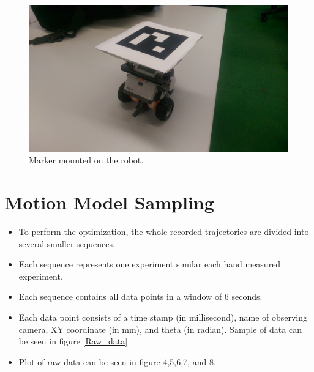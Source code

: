 \documentclass[paper=a4, fontsize=11pt]{scrartcl} %
\begin{document}
	\begin{figure}[h!]
        \begin{center}
            \setlength{\fboxsep}{0.5pt} %
            \setlength{\fboxrule}{0.5pt}
            \includegraphics[width=12cm,fbox]{images/marker_robot.jpg}
            \caption{Marker mounted on the robot.}
        \end{center}
    \end{figure}
    
    \newpage
    \section{Motion Model Sampling}
    \begin{itemize}
	    \item To perform the optimization, the whole recorded trajectories are divided into several smaller sequences.
	    \item Each sequence represents one experiment similar each hand measured experiment.
	    \item Each sequence contains all data points in a window of 6 seconds.
	    \item Each data point consists of a time stamp (in millisecond), name of observing camera, XY coordinate (in mm), and theta (in radian). Sample of data can be seen in figure \ref{Raw_data}
	    \item Plot of raw data can be seen in figure 4,5,6,7, and 8.
    \end{itemize}
    
\end{document}
